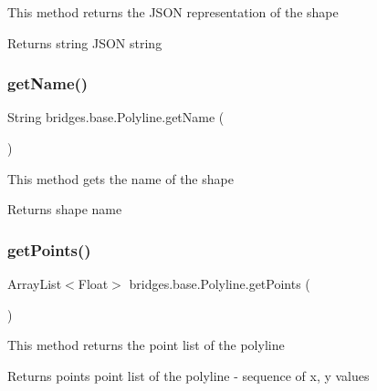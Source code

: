 This method returns the J\+S\+ON representation of the shape

\begin{DoxyReturn}{Returns}
string J\+S\+ON string 
\end{DoxyReturn}
\mbox{\label{classbridges_1_1base_1_1_polyline_a5b56cee642a6381ea940c75a336076ea}} 
\subsubsection{\texorpdfstring{get\+Name()}{getName()}}
{\footnotesize\ttfamily String bridges.\+base.\+Polyline.\+get\+Name (\begin{DoxyParamCaption}{ }\end{DoxyParamCaption})}

This method gets the name of the shape

\begin{DoxyReturn}{Returns}
shape name 
\end{DoxyReturn}
\mbox{\label{classbridges_1_1base_1_1_polyline_ae610d680975558db90a06949991583f8}} 
\subsubsection{\texorpdfstring{get\+Points()}{getPoints()}}
{\footnotesize\ttfamily Array\+List$<$Float$>$ bridges.\+base.\+Polyline.\+get\+Points (\begin{DoxyParamCaption}{ }\end{DoxyParamCaption})}

This method returns the point list of the polyline

\begin{DoxyReturn}{Returns}
points point list of the polyline -\/ sequence of x, y values 
\end{DoxyReturn}
\mbox{\label{classbridges_1_1base_1_1_polyline_ad0bb71fa4d15e2b3afc6fd26636a7931}} 
